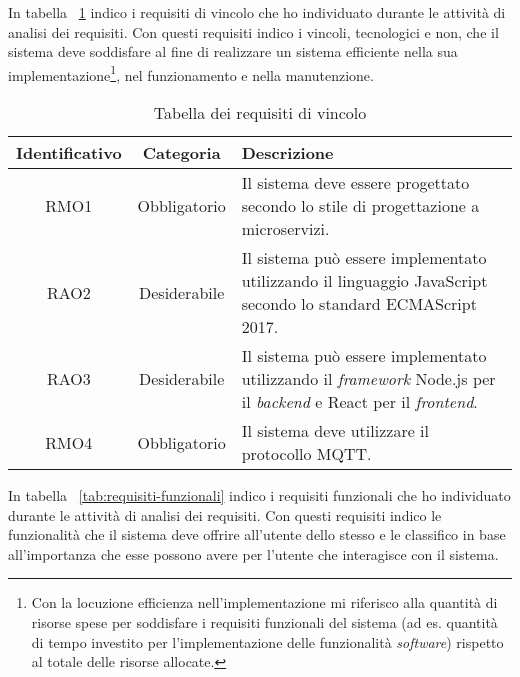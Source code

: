 
In tabella ~\ref{tab:requisiti-vincolo} indico i requisiti di vincolo che ho individuato durante le attività di analisi dei requisiti. Con questi requisiti indico i vincoli, tecnologici e non, che il sistema deve soddisfare al fine di realizzare un sistema efficiente nella sua implementazione\footnote{Con la locuzione efficienza nell'implementazione mi riferisco alla quantità di risorse spese per soddisfare i requisiti funzionali del sistema (ad es. quantità di tempo investito per l'implementazione delle funzionalità \emph{software}) rispetto al totale delle risorse allocate.}, nel funzionamento e nella manutenzione.

\begin{table}[H]
\caption{Tabella dei requisiti di vincolo}
\label{tab:requisiti-vincolo}
\begin{tabularx}{\linewidth}{|c|c|X|}
\hline
\textbf{Identificativo} & \textbf{Categoria} & \textbf{Descrizione} \\
\hline
RMO1 & Obbligatorio & Il sistema deve essere progettato secondo lo stile di progettazione a microservizi. \\
\hline
RAO2 & Desiderabile & Il sistema può essere implementato utilizzando il linguaggio JavaScript secondo lo standard ECMAScript 2017. \\
\hline
RAO3 & Desiderabile & Il sistema può essere implementato utilizzando il \emph{framework} Node.js per il \emph{backend} e React per il \emph{frontend}. \\
\hline
RMO4 & Obbligatorio & Il sistema deve utilizzare il protocollo MQTT. \\
\hline
\end{tabularx}
\end{table}

In tabella ~\ref{tab:requisiti-funzionali} indico i requisiti funzionali che ho individuato durante le attività di analisi dei requisiti. Con questi requisiti indico le funzionalità che il sistema deve offrire all'utente dello stesso e le classifico in base all'importanza che esse possono avere per l'utente che interagisce con il sistema.

